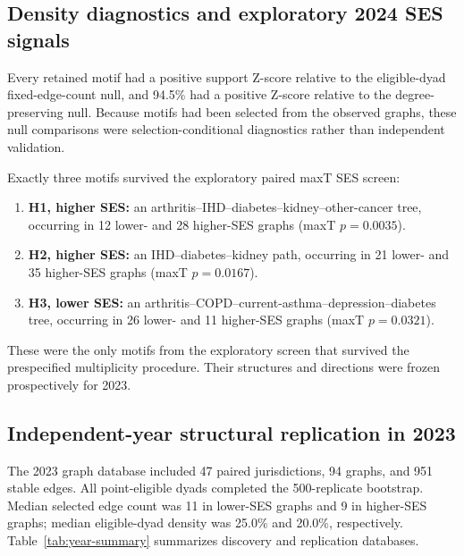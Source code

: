 \documentclass[11pt]{article}
\begin{document}
\subsection{Density diagnostics and exploratory 2024 SES signals}

Every retained motif had a positive support Z-score relative to the
eligible-dyad fixed-edge-count null, and 94.5\% had a positive Z-score
relative to the degree-preserving null. Because motifs had been selected from
the observed graphs, these null comparisons were selection-conditional
diagnostics rather than independent validation.

Exactly three motifs survived the exploratory paired maxT SES screen:
\begin{enumerate}
  \item \textbf{H1, higher SES:} an
  arthritis--IHD--diabetes--kidney--other-cancer tree, occurring in 12 lower-
  and 28 higher-SES graphs (maxT $p=0.0035$).
  \item \textbf{H2, higher SES:} an IHD--diabetes--kidney path, occurring in
  21 lower- and 35 higher-SES graphs (maxT $p=0.0167$).
  \item \textbf{H3, lower SES:} an
  arthritis--COPD--current-asthma--depression--diabetes tree, occurring in
  26 lower- and 11 higher-SES graphs (maxT $p=0.0321$).
\end{enumerate}
These were the only motifs from the exploratory screen that survived the
prespecified multiplicity procedure. Their structures and directions were
frozen prospectively for 2023.

\subsection{Independent-year structural replication in 2023}

The 2023 graph database included 47 paired jurisdictions, 94 graphs, and 951
stable edges. All point-eligible dyads completed the 500-replicate bootstrap.
Median selected edge count was 11 in lower-SES graphs and 9 in higher-SES
graphs; median eligible-dyad density was 25.0\% and 20.0\%, respectively.
Table~\ref{tab:year-summary} summarizes discovery and replication databases.
\end{document}
